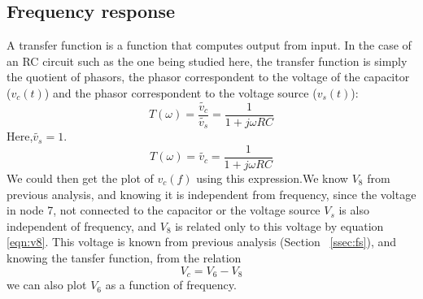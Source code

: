 \subsection{Frequency response}
\label{ssec:freq}
A transfer function is a function that computes output from input. In the case of an RC circuit such as the one being studied here, the transfer function is simply the quotient of phasors, the phasor correspondent to the voltage of the capacitor ($v_c (t)$) and the phasor correspondent to the voltage source ($v_s (t)$):
\[ T(\omega)= \frac{\widetilde{v_c}}{\widetilde{v_s}}=\frac{1}{1+j\omega R C}\]
Here,$\widetilde{v_s}=1$.
\[ T(\omega)= \widetilde{v_c}=\frac{1}{1+j\omega R C}\]
We could then get the plot of $v_c(f)$ using this expression.We know $V_8$ from previous analysis, and knowing it is independent from frequency, since the voltage in node 7, not connected to the capacitor or the voltage source $V_s$ is also independent of frequency, and $V_8$ is related only to this voltage by equation \eqref{eqn:v8}. This voltage is known from previous analysis (Section ~\ref{ssec:fs}), and knowing the tansfer function, from the relation
\[V_c=V_6-V_8\]
we can also plot $V_6$ as a function of frequency.
